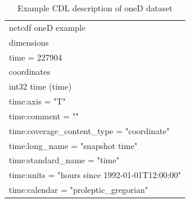 \begin{longtable}{|p{\textwidth}|}
\caption{Example CDL description of oneD dataset}
\label{tab:cdl-oneD} \\
\hline \endhead
\hline \endfoot
netcdf oneD example\\
dimensions\\
\hline
\rowcolor{YellowGreen}  time = 227904\\
\hline

coordinates\\
\hline
\rowcolor{Apricot}\hspace{0.5cm}int32 time (time)\\
\rowcolor{Apricot}\hspace{0.5cm}\hspace{0.5cm}time:axis = "T"\\
\rowcolor{Apricot}\hspace{0.5cm}\hspace{0.5cm}time:comment = ""\\
\rowcolor{Apricot}\hspace{0.5cm}\hspace{0.5cm}time:coverage\_content\_type = "coordinate"\\
\rowcolor{Apricot}\hspace{0.5cm}\hspace{0.5cm}time:long\_name = "snapshot time"\\
\rowcolor{Apricot}\hspace{0.5cm}\hspace{0.5cm}time:standard\_name = "time"\\
\rowcolor{Apricot}\hspace{0.5cm}\hspace{0.5cm}time:units = "hours since 1992-01-01T12:00:00"\\
\rowcolor{Apricot}\hspace{0.5cm}\hspace{0.5cm}time:calendar = "proleptic\_gregorian"\\
\hline


\end{longtable}
